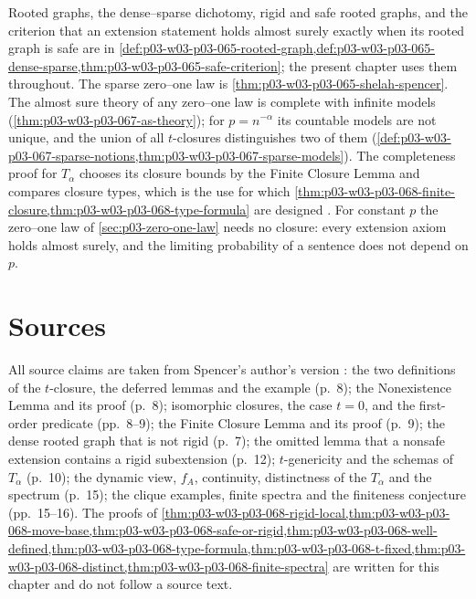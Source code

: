 Rooted graphs, the dense--sparse dichotomy, rigid and safe rooted graphs,
and the criterion that an extension statement holds almost surely exactly
when its rooted graph is safe are in
\cref{def:p03-w03-p03-065-rooted-graph,def:p03-w03-p03-065-dense-sparse,thm:p03-w03-p03-065-safe-criterion};
the present chapter uses them throughout.  The sparse zero--one law is
\cref{thm:p03-w03-p03-065-shelah-spencer}.  The almost sure theory of any
zero--one law is complete with infinite models
(\cref{thm:p03-w03-p03-067-as-theory}); for \(p=n^{-\alpha}\) its countable
models are not unique, and the union of all \(t\)-closures distinguishes two
of them (\cref{def:p03-w03-p03-067-sparse-notions,thm:p03-w03-p03-067-sparse-models}).
The completeness proof for \(T_\alpha\) chooses its closure bounds by the
Finite Closure Lemma and compares closure types, which is the use for which
\cref{thm:p03-w03-p03-068-finite-closure,thm:p03-w03-p03-068-type-formula}
are designed \cite[p.~11]{Spencer2007LogicRandomStructuresAuthor}.  For constant \(p\) the
zero--one law of \cref{sec:p03-zero-one-law} needs no closure: every extension
axiom holds almost surely, and the limiting probability of a sentence does not
depend on \(p\).

\section{Sources}
\label{sec:p03-w03-p03-068-sources}

All source claims are taken from Spencer's author's version
\cite{Spencer2007LogicRandomStructuresAuthor}: the two definitions of the \(t\)-closure, the
deferred lemmas and the example (p.~8); the Nonexistence Lemma and its proof
(p.~8); isomorphic closures, the case \(t=0\), and the first-order predicate
(pp.~8--9); the Finite Closure Lemma and its proof (p.~9); the dense rooted
graph that is not rigid (p.~7); the omitted lemma that a nonsafe extension
contains a rigid subextension (p.~12); \(t\)-genericity and
the schemas of \(T_\alpha\) (p.~10); the dynamic view, \(f_A\), continuity,
distinctness of the \(T_\alpha\) and the spectrum (p.~15); the clique
examples, finite spectra and the finiteness conjecture (pp.~15--16).  The
proofs of
\cref{thm:p03-w03-p03-068-rigid-local,thm:p03-w03-p03-068-move-base,thm:p03-w03-p03-068-safe-or-rigid,thm:p03-w03-p03-068-well-defined,thm:p03-w03-p03-068-type-formula,thm:p03-w03-p03-068-t-fixed,thm:p03-w03-p03-068-distinct,thm:p03-w03-p03-068-finite-spectra}
are written for this chapter and do not follow a source text.
